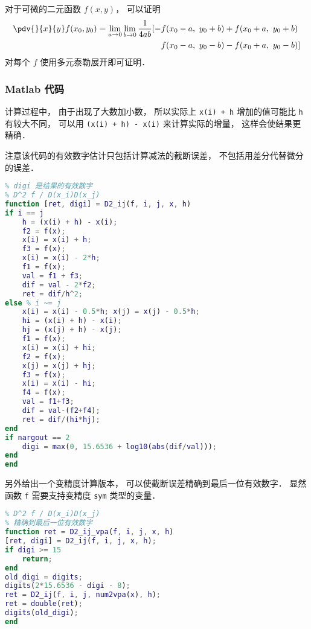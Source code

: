 
\begin{issues}
\issueDraft
\end{issues}


对于可微的二元函数 $f(x,y)$， 可以证明
\begin{equation}
\begin{aligned}
\pdv{}{x}{y} f(x_0,y_0) = \lim_{a\to 0}\lim_{b\to 0}\frac{1}{4ab}[-& f(x_0-a,\ y_0+b) + f(x_0+a,\  y_0+b)\\
& f(x_0-a,\  y_0-b) - f(x_0+a,\  y_0-b)]
\end{aligned}
\end{equation}
对每个 $f$ 使用多元泰勒展开即可证明．

\subsubsection{Matlab 代码}

计算过程中， 由于出现了大数加小数， 所以实际上 \verb|x(i) + h| 增加的值可能比 \verb|h| 有较大不同， 可以用 \verb|(x(i) + h) - x(i)| 来计算实际的增量， 这样会使结果更精确．

注意该代码的有效数字估计只包括计算减法的截断误差， 不包括用差分代替微分的误差．
\begin{lstlisting}[language=matlab, caption=D2\_ij.m]
% 数值二阶偏导
% digi 是结果的有效数字
% D^2 f / D(x_i)D(x_j)
function [ret, digi] = D2_ij(f, i, j, x, h)
if i == j
    h = (x(i) + h) - x(i);
    f2 = f(x);
    x(i) = x(i) + h;
    f3 = f(x);
    x(i) = x(i) - 2*h;
    f1 = f(x);
    val = f1 + f3;
    dif = val - 2*f2;
    ret = dif/h^2;
else % i ~= j
    x(i) = x(i) - 0.5*h; x(j) = x(j) - 0.5*h;
    hi = (x(i) + h) - x(i);
    hj = (x(j) + h) - x(j);
    f1 = f(x);
    x(i) = x(i) + hi;
    f2 = f(x);
    x(j) = x(j) + hj;
    f3 = f(x);
    x(i) = x(i) - hi;
    f4 = f(x);
    val = f1+f3;
    dif = val-(f2+f4);
    ret = dif/(hi*hj);
end
if nargout == 2
    digi = max(0, 15.6536 + log10(abs(dif/val)));
end
end
\end{lstlisting}

另外给出一个变精度计算版本， 可以使截断误差精确到最后一位有效数字． 显然函数 \verb|f| 需要支持变精度 \verb|sym| 类型的变量．
\begin{lstlisting}[language=matlab, caption=D2\_ij\_vpa.m]
% 数值二阶偏导 (变精度)
% D^2 f / D(x_i)D(x_j)
% 精确到最后一位有效数字
function ret = D2_ij_vpa(f, i, j, x, h)
[ret, digi] = D2_ij(f, i, j, x, h);
if digi >= 15
    return;
end
old_digi = digits;
digits(2*15.6536 - digi - 8);
ret = D2_ij(f, i, j, num2vpa(x), h);
ret = double(ret);
digits(old_digi);
end
\end{lstlisting}
